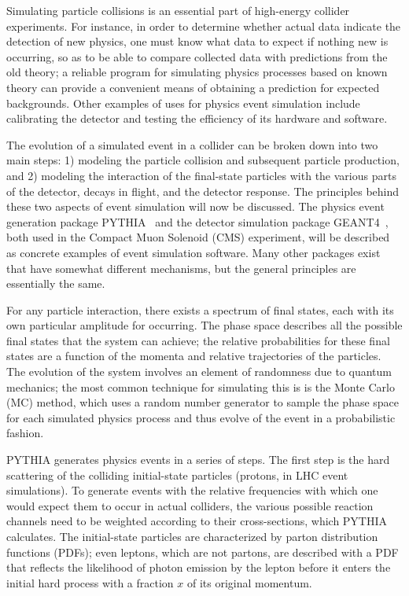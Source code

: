 Simulating particle collisions is an essential part of high-energy collider experiments. For instance, in order to determine whether actual data indicate the detection of new physics, one must know what data to expect if nothing new is occurring, so as to be able to compare collected data with predictions from the old theory; a reliable program for simulating physics processes based on known theory can provide a convenient means of obtaining a prediction for expected backgrounds. Other examples of uses for physics event simulation include calibrating the detector and testing the efficiency of its hardware and software.

The evolution of a simulated event in a collider can be broken down into two main steps: 1) modeling the particle collision and subsequent particle production, and 2) modeling the interaction of the final-state particles with the various parts of the detector, decays in flight, and the detector response. The principles behind these two aspects of event simulation will now be discussed. The physics event generation package PYTHIA~\cite{Sjostrand:2006za} and the detector simulation package GEANT4~\cite{documents:998155}, both used in the Compact Muon Solenoid (CMS) experiment, will be described as concrete examples of event simulation software. Many other packages exist that have somewhat different mechanisms, but the general principles are essentially the same.

For any particle interaction, there exists a spectrum of final states, each with its own particular amplitude for occurring. The phase space describes all the possible final states that the system can achieve; the relative probabilities for these final states are a function of the momenta and relative trajectories of the particles. The evolution of the system involves an element of randomness due to quantum mechanics; the most common technique for simulating this is is the Monte Carlo (MC) method, which uses a random number generator to sample the phase space for each simulated physics process and thus evolve of the event in a probabilistic fashion.

PYTHIA generates physics events in a series of steps. The first step is the hard scattering of the colliding initial-state particles (protons, in LHC event simulations). To generate events with the relative frequencies with which one would expect them to occur in actual colliders, the various possible reaction channels need to be weighted according to their cross-sections, which PYTHIA calculates. The initial-state particles are characterized by parton distribution functions (PDFs); even leptons, which are not partons, are described with a PDF that reflects the likelihood of photon emission by the lepton before it enters the initial hard process with a fraction $x$ of its original momentum.


